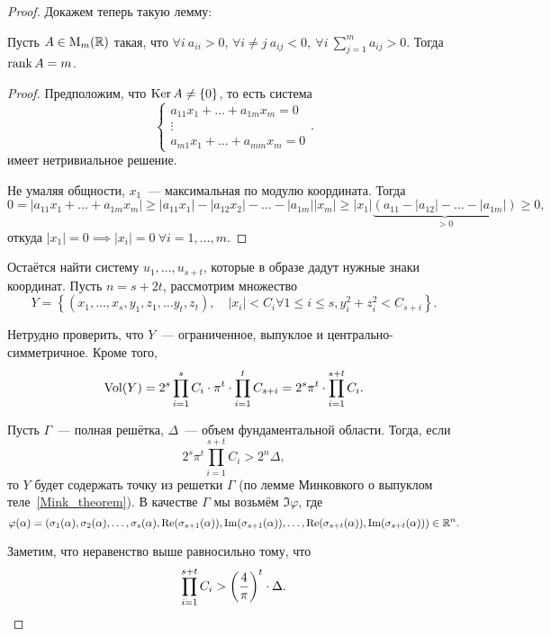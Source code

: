 \begin{proof}
	 Докажем теперь такую лемму: 

	\begin{lemma} 
		Пусть $A \in \mathrm{M}_{m}(\R)$ такая, что $\forall i  \ a_{ii} > 0$, $\forall i \neq j \ a_{i j } < 0, \ \forall i \ \sum_{j = 1}^{m} a_{i j} > 0$. Тогда $\rank{A} = m$. 
	\end{lemma}

	\begin{proof}
		 Предположим, что $\Ker{A} \neq \{ 0 \}$, то есть система
		 \[
		 	\begin{cases} a_{11} x_1 + \ldots + a_{1 m } x_m = 0 \\ \vdots \\ a_{m 1} x_1 + \ldots + a_{m m} x_m = 0 \end{cases}.
		 \]
		 имеет нетривиальное решение. 

		 Не умаляя общности, $x_1$~--- максимальная по модулю координата. Тогда 
		 \[
		 	 0 = |a_{11} x_1 + \ldots + a_{1m} x_m| \ge |a_{11} x_{1}| - |a_{1 2} x_2| - \ldots - |a_{1 m}||x_m| \ge |x_1|\underbrace{(a_{1 1} - |a_{1 2} | - \ldots - |a_{1 m }|)}_{> 0} \ge 0,
		 \]
		 откуда $|x_1| = 0 \implies |x_i| = 0 \ \forall i = 1, \ldots, m$.
	\end{proof}

	Остаётся найти систему $u_1, \ldots, u_{s + t}$, которые в образе дадут нужные знаки координат. Пусть $n = s + 2t$, рассмотрим множество
	\[
	 	Y = \left\{ (x_1, \ldots, x_{s}, y_1, z_1, \ldots y_t, z_t), \quad |x_i| < C_i \forall 1 \le i \le s, y_i^2 + z_i^2 < C_{s + i} \right\}.
	 \] 

	 Нетрудно проверить, что $Y$~--- ограниченное, выпуклое и центрально-симметричное. Кроме того, 
	 \[
	 	\Vol\lr*{Y} = 2^s \prod_{i = 1}^{s} C_i \cdot \pi^t \cdot \prod_{i = 1}^t C_{s + i} = 2^s \pi^t \cdot \prod_{i = 1}^{s + t} C_i. 
	 \]

	 Пусть $\Gamma$~--- полная решётка, $\Delta$~--- объем фундаментальной области. Тогда, если 
	 \[
	 	2^{s}\pi^{t} \prod_{i = 1}^{s + t} C_i > 2^n \Delta,
	 \]
	 то $Y$ будет содержать точку из решетки $\Gamma$ (по лемме Минковкого о выпуклом теле~\ref{Mink_theorem}).  В качестве $\Gamma$ мы возьмём $\Im{\varphi}$, где 
	 \[	  	
				\varphi(\alpha) = (\sigma_1(\alpha), \sigma_2(\alpha), \ldots, \sigma_s(\alpha), \Re(\sigma_{s + 1}(\alpha)), \Im(\sigma_{s + 1}(\alpha)),  \ldots, \Re(\sigma_{s + t}(\alpha)), \Im(\sigma_{s + t}(\alpha))) \in \R^n.
			\]

	 Заметим, что неравенство выше равносильно тому, что 
	 \[
	 	\prod_{i = 1}^{s + t}C_i >  \lr*{\frac{4}{\pi}}^t \cdot \Delta.
	 \]



\end{proof}
